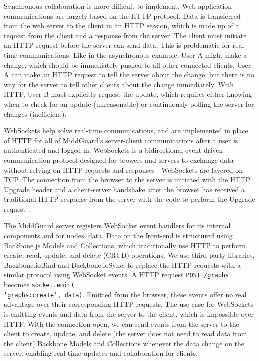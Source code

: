 \documentclass[midd]{thesis}
\begin{document}
Synchronous collaboration is more difficult to implement. Web application
communications are largely based on the HTTP protocol. Data is transferred from
the web server to the client in an HTTP session, which is made up of a request
from the client and a response from the server. The client must initiate an HTTP
request before the server can send data. This is problematic for real-time
communications. Like in the asynchronous example, User A might make a change,
which should be immediately pushed to all other connected clients. User A can
make an HTTP request to tell the server about the change, but there is no way
for the server to tell other clients about the change immediately. With HTTP,
User B must explicitly request the update, which requires either knowing when to
check for an update (unreasonable) or continuously polling the server for
changes (inefficient).

WebSockets help solve real-time communications, and are implemented in place of
HTTP for all of MiddGuard's server-client communications after a user is
authenticated and logged in. WebSockets is a bidirectional event-driven
communication protocol designed for browers and servers to exchange data without
relying on HTTP requests and responses \cite{mdn-websockets}. WebSockets are
layered on TCP. The connection from the browser to the server is initiated with
the HTTP Upgrade header and a client-server handshake after the browser has
received a traditional HTTP response from the server with the code to perform
the Upgrade request \cite{RFC6455}.

The MiddGuard server registers WebSocket event handlers for its internal
components and for nodes' data. Data on the front-end is structured using
Backbone.js Models and Collections, which traditionally use HTTP to perform
create, read, update, and delete (CRUD) operations. We use third-party
libraries, Backbone.ioBind and Backbone.ioSync, to replace the HTTP requests
with a similar protocol using WebSocket events. A HTTP request \texttt{POST
/graphs} becomes \texttt{socket.emit(\\'graphs:create', data)}. Emitted from the
browser, these events offer no real advantage over their corresponding HTTP
requests. The use case for WebSockets is emitting events and data from the
server to the client, which is impossible over HTTP. With the connection open,
we can send events from the server to the client to create, update, and delete
(the server does not need to read data from the client) Backbone Models and
Collections whenever the data change on the server, enabling real-time updates
and collaboration for clients.
\end{document}
